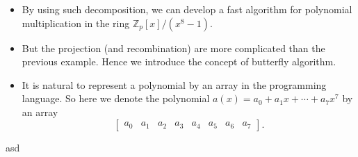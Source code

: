 \begin{frame}
    \begin{itemize}
        \item By using such decomposition, we can develop a fast algorithm for 
            polynomial multiplication in the ring \( \mathbb{Z}_{p}[x]/(x^{8}-1) \).
        \item But the projection (and recombination) are more complicated than the 
            previous example. Hence we introduce the concept of butterfly algorithm.
        \item It is natural to represent a polynomial by an array in the programming language.
            So here we denote the polynomial \( a(x) = a_{0} + a_{1}x + \cdots + a_{7}x^{7} \) by 
            an array
            \[
                \begin{bmatrix}
                    a_{0} & a_{1} & a_{2} & a_{3} & a_{4} & a_{5} & a_{6} & a_{7}
                \end{bmatrix}.
            \]

    
    \end{itemize}
\end{frame}



\begin{frame}
asd    
\end{frame}

